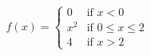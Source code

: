\documentclass[preview]{standalone}
\begin{document}
\begin{align*}
f(x) = \begin{cases} 0 & \text{if } x < 0 \\ x^2 & \text{if } 0 \leq x \leq 2 \\ 4 & \text{if } x > 2 \end{cases}
\end{align*}
\end{document}
